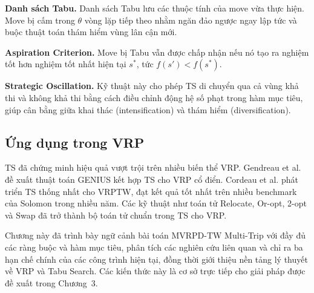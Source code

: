 \documentclass[../DoAn.tex]{subfiles}
\begin{document}
\textbf{Danh sách Tabu.} Danh sách Tabu lưu các thuộc tính của move vừa thực hiện. Move bị cấm trong $\theta$ vòng lặp tiếp theo nhằm ngăn đảo ngược ngay lập tức và buộc thuật toán thám hiểm vùng lân cận mới.

\textbf{Aspiration Criterion.} Move bị Tabu vẫn được chấp nhận nếu nó tạo ra nghiệm tốt hơn nghiệm tốt nhất hiện tại $s^*$, tức $f(s') < f(s^*)$.

\textbf{Strategic Oscillation.} Kỹ thuật này cho phép TS di chuyển qua cả vùng khả thi và không khả thi bằng cách điều chỉnh động hệ số phạt trong hàm mục tiêu, giúp cân bằng giữa khai thác (intensification) và thám hiểm (diversification).

\subsection{Ứng dụng trong VRP}

TS đã chứng minh hiệu quả vượt trội trên nhiều biến thể VRP. Gendreau et al. đề xuất thuật toán GENIUS kết hợp TS cho VRP cổ điển. Cordeau et al. phát triển TS thống nhất cho VRPTW, đạt kết quả tốt nhất trên nhiều benchmark của Solomon trong nhiều năm. Các kỹ thuật như toán tử Relocate, Or-opt, 2-opt và Swap đã trở thành bộ toán tử chuẩn trong TS cho VRP.

\bigskip
Chương này đã trình bày ngữ cảnh bài toán MVRPD-TW Multi-Trip với đầy đủ các ràng buộc và hàm mục tiêu, phân tích các nghiên cứu liên quan và chỉ ra ba hạn chế chính của các công trình hiện tại, đồng thời giới thiệu nền tảng lý thuyết về VRP và Tabu Search. Các kiến thức này là cơ sở trực tiếp cho giải pháp được đề xuất trong Chương~3.
\end{document}

